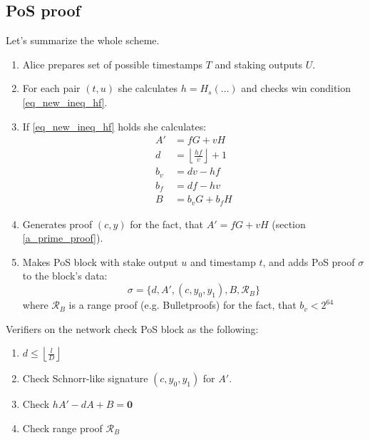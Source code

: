 \documentclass{article}
\newcommand{\floor}[1]{\left\lfloor #1 \right\rfloor}
\numberwithin{figure}{section}
\begin{document}
\subsection{PoS proof} \label{ssec_pos_proof}

Let's summarize the whole scheme.

\begin{enumerate}
    \item Alice prepares set of possible timestamps $T$ and staking outputs $U$.
    
    \item For each pair $(t, u)$ she calculates $h = H_s(\dots)$ and checks win condition \eqref{eq_new_ineq_hf}.
    
    \item If \eqref{eq_new_ineq_hf} holds she calculates:
    \[ \begin{split}
    A' &= fG + vH \\
    d &= \floor{\frac{hf}{v}} + 1\\
    b_v &= dv - hf \\
    b_f &= df - hv \\
    B &= b_v G + b_f H
    \end{split}
    \]
    
    \item Generates proof $(c, y)$ for the fact, that $A' = fG + vH$ (section \ref{a_prime_proof}).
    
    \item Makes PoS block with stake output $u$ and timestamp $t$, and adds PoS proof $\sigma$ to the block's data:
    \begin{equation} \label{eq_pos_proof}
    \sigma = \{ d, A', (c, y_0, y_1), B, \mathcal{R}_B \}
    \end{equation}
    where $\mathcal{R}_B$ is a range proof (e.g. Bulletproofs) for the fact, that $b_v < 2^{64}$ 
\end{enumerate}

\noindent 
Verifiers on the network check PoS block as the following:

\begin{enumerate}
    \item $d \leq \floor{\frac{l}{D}}$
    
    \item Check Schnorr-like signature $(c, y_0, y_1)$ for $A'$.
    
    \item Check $hA'-dA+B=\mathbf{0}$
    
    \item Check range proof $\mathcal{R}_B$
\end{enumerate}
\end{document}
